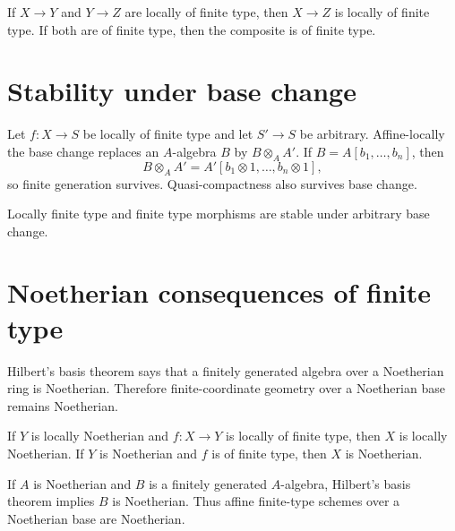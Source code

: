 \begin{proposition}[Composition]\label{prop:vi26-composition}
If $X\to Y$ and $Y\to Z$ are locally of finite type, then $X\to Z$ is locally of finite type.  If both are of
finite type, then the composite is of finite type.
\end{proposition}



\section{Stability under base change}
Let $f:X\to S$ be locally of finite type and let $S'\to S$ be arbitrary.  Affine-locally the base change replaces
an $A$-algebra $B$ by $B\otimes_AA'$.  If $B=A[b_1,\dots,b_n]$, then
\[
B\otimes_AA'=A'[b_1\otimes1,\dots,b_n\otimes1],
\]
so finite generation survives.  Quasi-compactness also survives base change.

\begin{theorem}\label{thm:vi26-base-change}
Locally finite type and finite type morphisms are stable under arbitrary base change.
\end{theorem}



\section{Noetherian consequences of finite type}
Hilbert's basis theorem says that a finitely generated algebra over a Noetherian ring is Noetherian.  Therefore
finite-coordinate geometry over a Noetherian base remains Noetherian.

\begin{theorem}\label{thm:vi26-noetherian-consequence}
If $Y$ is locally Noetherian and $f:X\to Y$ is locally of finite type, then $X$ is locally Noetherian.  If $Y$ is
Noetherian and $f$ is of finite type, then $X$ is Noetherian.
\end{theorem}



\begin{example}\label{ex:vi26-expand-03}
If $A$ is Noetherian and $B$ is a finitely generated $A$-algebra, Hilbert's basis theorem implies $B$ is Noetherian.  Thus affine finite-type schemes over a Noetherian base are Noetherian.
\end{example}
